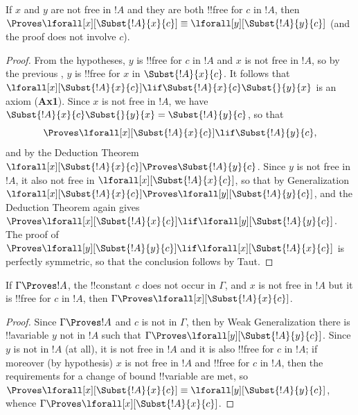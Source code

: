 \documentclass[../../../include/open-logic-section]{subfiles}
\begin{document}
\begin{lem}
If $x$ and $y$ are not free in $!A$ and they are both !!{free for} $c$
in $!A$, then $\Proves \lforall[x][\Subst{!A}{x}{c}] \equiv
\lforall[y][\Subst{!A}{y}{c}]$ (and the proof does not involve $c$).
\end{lem}

\begin{proof} 
From the hypotheses, $y$ is !!{free for} $c$ in $!A$ and $x$ is not
free in $!A$, so by the previous , $y$ is
!!{free for} $x$ in $\Subst{!A}{x}{c}$. It follows that
$\lforall[x][\Subst{!A}{x}{c}] \lif \Subst{!A}{x}{c} \Subst{}{y}{x}$
is an axiom (\textbf{Ax1}). Since $x$ is not free in $!A$, we have
$\Subst{!A}{x}{c} \Subst{}{y}{x} = \Subst{!A}{y}{c}$, so that 
\[
\Proves \lforall[x][\Subst{!A}{x}{c}] \lif \Subst{!A}{y}{c}, 
\] 
and by the Deduction Theorem $\lforall[x][\Subst{!A}{x}{c}] \Proves
\Subst{!A}{y}{c}$. Since $y$ is not free in $!A$, it also not free in
$\lforall[x][\Subst{!A}{x}{c}]$, so that by Generalization
$\lforall[x][\Subst{!A}{x}{c}] \Proves \lforall[y][\Subst{!A}{y}{c}]$,
and the Deduction Theorem again gives $\Proves
\lforall[x][\Subst{!A}{x}{c}] \lif \lforall[y][\Subst{!A}{y}{c}]$.
The proof of $\Proves \lforall[y][\Subst{!A}{y}{c}] \lif \lforall[x]
[\Subst{!A}{x}{c}]$ is perfectly symmetric, so that the conclusion
follows by Taut.
\end{proof}

\begin{thm}
If $\Gamma \Proves !A$, the !!{constant} $c$ does not occur in
$\Gamma$, and $x$ is not free in $!A$ but it is !!{free for} $c$ in $!A$,
then $\Gamma \Proves \lforall[x][\Subst{!A}{x}{c}]$. 
\end{thm}

\begin{proof} 
Since $\Gamma \Proves !A$ and $c$ is not in $\Gamma$, then by
Weak Generalization there is !!a{variable} $y$ not in $!A$ such that
$\Gamma \Proves \lforall[y][\Subst{!A}{y}{c}]$. Since $y$ is not in $!A$
(at all), it is not free in $!A$ and it is also !!{free for} $c$ in $!A$;
if moreover (by hypothesis) $x$ is not free in $!A$ and !!{free for} $c$ in
$!A$, then the requirements for a change of bound !!{variable} are met, so
$\Proves \lforall[x][\Subst{!A}{x}{c}] \equiv
\lforall[y][\Subst{!A}{y}{c}]$, whence $\Gamma \Proves
\lforall[x][\Subst{!A}{x}{c}]$. 
\end{proof}
\end{document}
